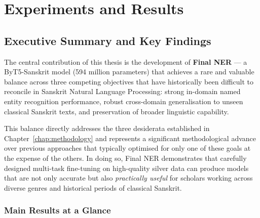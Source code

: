 
\chapter{Experiments and Results}
\label{chap:experiments}

\section{Executive Summary and Key Findings}

The central contribution of this thesis is the development of \textbf{Final NER} --- a ByT5-Sanskrit \cite{nehrdich2024byt5sanskrit, xue2022byt5} model (594 million parameters) that achieves a rare and valuable balance across three competing objectives that have historically been difficult to reconcile in Sanskrit Natural Language Processing: strong in-domain named entity recognition performance, robust cross-domain generalisation to unseen classical Sanskrit texts, and preservation of broader linguistic capability.

This balance directly addresses the three desiderata established in Chapter~\ref{chap:methodology} and represents a significant methodological advance over previous approaches that typically optimised for only one of these goals at the expense of the others. In doing so, Final NER demonstrates that carefully designed multi-task fine-tuning \cite{caruana1997multitask} on high-quality silver data can produce models that are not only accurate but also \textit{practically useful} for scholars working across diverse genres and historical periods of classical Sanskrit.

\subsection{Main Results at a Glance}

\begin{table}[H]
\centering
\caption{Final NER --- Summary of Performance Across All Three Desiderata}
\label{tab:core_results}
\small
\end{table}

